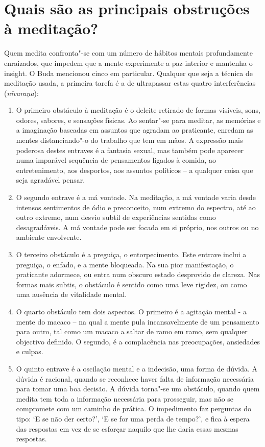 \section{Quais são as principais obstruções à meditação?}

Quem medita confronta"-se com um número de hábitos mentais profundamente
enraizados, que impedem que a mente experimente a paz interior e
mantenha o insight. O Buda mencionou cinco em particular. Qualquer que
seja a técnica de meditação usada, a primeira tarefa é a de ultrapassar
estas quatro interferências (\emph{nīvaraṇa}):

\begin{enumerate}
\item
  O primeiro obstáculo à meditação é o deleite retirado de formas
  visíveis, sons, odores, sabores, e sensações físicas. Ao sentar"-se
  para meditar, as memórias e a imaginação baseadas em assuntos que
  agradam ao praticante, enredam as mentes distanciando"-o do trabalho
  que tem em mãos. A expressão mais poderosa destes entraves é a
  fantasia sexual, mas também pode aparecer numa imparável sequência de
  pensamentos ligados à comida, ao entretenimento, aos desportos, aos
  assuntos políticos -- a qualquer coisa que seja agradável pensar.
\item
  O segundo entrave é a má vontade. Na meditação, a má vontade varia
  desde intensos sentimentos de ódio e preconceito, num extremo do
  espectro, até ao outro extremo, num desvio subtil de experiências
  sentidas como desagradáveis. A má vontade pode ser focada em si
  próprio, nos outros ou no ambiente envolvente.
\item
  O terceiro obstáculo é a preguiça, o entorpecimento. Este entrave
  inclui a preguiça, o enfado, e a mente bloqueada. Na sua pior
  manifestação, o praticante adormece, ou entra num obscuro estado
  desprovido de clareza. Nas formas mais subtis, o obstáculo é sentido
  como uma leve rigidez, ou como uma ausência de vitalidade mental.
\item
  O quarto obstáculo tem dois aspectos. O primeiro é a agitação mental -
  a mente do macaco -- na qual a mente pula incansavelmente de um
  pensamento para outro, tal como um macaco a saltar de ramo em ramo,
  sem qualquer objectivo definido. O segundo, é a complacência nas
  preocupações, ansiedades e culpas.
\item
  O quinto entrave é a oscilação mental e a indecisão, uma forma de
  dúvida. A dúvida é racional, quando se reconhece haver falta de
  informação necessária para tomar uma boa decisão. A dúvida torna"-se um
  obstáculo, quando quem medita tem toda a informação necessária para
  prosseguir, mas não se compromete com um caminho de prática. O
  impedimento faz perguntas do tipo: `E se não der certo?', `E se
  for uma perda de tempo?', e fica à espera das respostas em vez de se
  esforçar naquilo que lhe daria essas mesmas respostas.
\end{enumerate}

